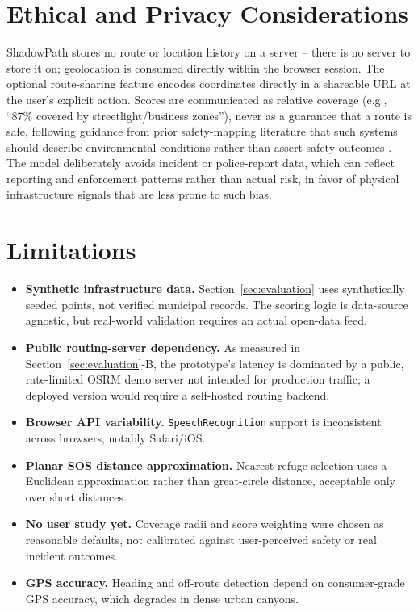 \documentclass[conference]{IEEEtran}
\begin{document}
\section{Ethical and Privacy Considerations}
\label{sec:ethics}

ShadowPath stores no route or location history on a server -- there is no server to store it on; geolocation is consumed directly within the browser session. The optional route-sharing feature encodes coordinates directly in a shareable URL at the user's explicit action. Scores are communicated as relative coverage (e.g., ``87\% covered by streetlight/business zones''), never as a guarantee that a route is safe, following guidance from prior safety-mapping literature that such systems should describe environmental conditions rather than assert safety outcomes \cite{gargiulo2020}. The model deliberately avoids incident or police-report data, which can reflect reporting and enforcement patterns rather than actual risk, in favor of physical infrastructure signals that are less prone to such bias.

\section{Limitations}
\label{sec:limitations}

\begin{itemize}
\item \textbf{Synthetic infrastructure data.} Section~\ref{sec:evaluation} uses synthetically seeded points, not verified municipal records. The scoring logic is data-source agnostic, but real-world validation requires an actual open-data feed.
\item \textbf{Public routing-server dependency.} As measured in Section~\ref{sec:evaluation}-B, the prototype's latency is dominated by a public, rate-limited OSRM demo server not intended for production traffic; a deployed version would require a self-hosted routing backend.
\item \textbf{Browser API variability.} \texttt{SpeechRecognition} support is inconsistent across browsers, notably Safari/iOS.
\item \textbf{Planar SOS distance approximation.} Nearest-refuge selection uses a Euclidean approximation rather than great-circle distance, acceptable only over short distances.
\item \textbf{No user study yet.} Coverage radii and score weighting were chosen as reasonable defaults, not calibrated against user-perceived safety or real incident outcomes.
\item \textbf{GPS accuracy.} Heading and off-route detection depend on consumer-grade GPS accuracy, which degrades in dense urban canyons.
\end{itemize}
\end{document}
